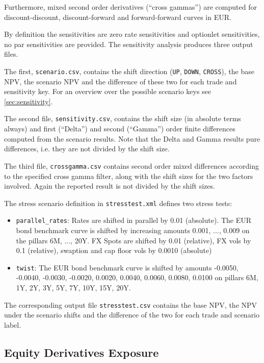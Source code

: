 \documentclass[12pt, a4paper]{article}
\begin{document}
Furthermore, mixed second order derivatives (``cross gammas'') are computed for discount-discount, discount-forward and
forward-forward curves in EUR.

By definition the sensitivities are zero rate sensitivities and optionlet sensitivities, no par sensitivities are
provided. The sensitivity analysis produces three output files.

The first, {\tt scenario.csv}, contains the shift
direction ({\tt UP}, {\tt DOWN}, {\tt CROSS}), the base NPV, the scenario NPV and the difference of these two for each
trade and sensitivity key. For an overview over the possible scenario keys see \ref{sec:sensitivity}.

The second file, {\tt sensitivity.csv}, contains the shift size (in absolute terms always) and first (``Delta'') and second
(``Gamma'') order finite differences computed from the scenario results. Note that the Delta and Gamma results pure
differences, i.e. they are not divided by the shift size.

The third file, {\tt crossgamma.csv} contains second order mixed differences according to the specified cross gamma
filter, along with the shift sizes for the two factors involved. Again the reported result is not divided by the shift
sizes.

The stress scenario definition in {\tt stresstest.xml} defines two stress tests:

\begin{itemize}
\item {\tt parallel\_rates}: Rates are shifted in parallel by 0.01 (absolute). The EUR bond benchmark curve is shifted by
  increasing amounts 0.001, ..., 0.009 on the pillars 6M, ..., 20Y. FX Spots are shifted by 0.01 (relative), FX vols by
  0.1 (relative), swaption and cap floor vols by 0.0010 (absolute)
\item {\tt twist}: The EUR bond benchmark curve is shifted by amounts -0.0050, -0.0040, -0.0030, -0.0020, 0.0020,
  0.0040, 0.0060, 0.0080, 0.0100 on pillars 6M, 1Y, 2Y, 3Y, 5Y, 7Y, 10Y, 15Y, 20Y.
\end{itemize}

The corresponding output file {\tt stresstest.csv} contains the base NPV, the NPV under the scenario shifts and the
difference of the two for each trade and scenario label.


\subsection{Equity Derivatives Exposure}\label{ex:equityderivatives}
\end{document}
